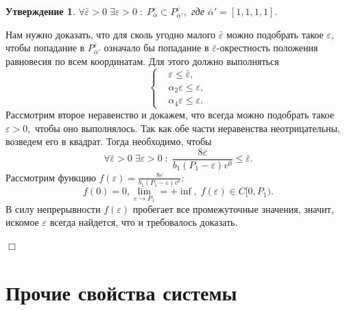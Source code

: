 \documentclass[11pt]{article}
\newtheorem{statement}{Утверждение}
\theoremstyle{definition}
\newenvironment{Proof}
{\par\noindent{\bf Доказательство.\\}} 
{\begin{flushright}$\Box$\end{flushright}}
\begin{document}
\begin{statement}
	$\forall \bar \varepsilon > 0 \; \exists \varepsilon > 0 \;:\;  P^{\varepsilon}_{\bar \alpha} \subset P^{\bar \varepsilon}_{\bar\alpha'} ,$ где
	$\bar \alpha' = [1,1,1,1].$
\end{statement}
\begin{Proof}
	Нам нужно доказать, что для сколь угодно малого $\bar \varepsilon$ можно подобрать такое $\varepsilon,$ чтобы попадание в $P^{\bar \varepsilon}_{\bar\alpha'}$ означало бы попадание в $\bar \varepsilon$-окрестность положения равновесия по всем координатам. Для этого должно выполняться
	$$
		\left\{
		\begin{aligned}
			&\varepsilon \leqslant \bar \varepsilon, \\
			&\alpha_2\varepsilon \leqslant \varepsilon, \\
			&\alpha_4\varepsilon \leqslant \varepsilon.
		\end{aligned}
		\right.
	$$
	Рассмотрим второе неравенство и докажем, что всегда можно подобрать такое $\varepsilon > 0,$ чтобы оно выполнялось. Так как обе части неравенства неотрицательны, возведем его в квадрат. Тогда необходимо, чтобы
	$$\forall \bar \varepsilon > 0 \; \exists \varepsilon > 0 \;:\; \frac{8\varepsilon}{b_1(P_1 - \varepsilon)v^0} \leqslant \bar \varepsilon.$$
	Рассмотрим функцию $f(\varepsilon) = \frac{8\varepsilon}{b_1(P_1 - \varepsilon)v^0}:$ 
	$$f(0) = 0, \lim_{\varepsilon \to P_1} = +\inf, \; f(\varepsilon) \in C[0,P_1).$$
	В силу непрерывности $f(\varepsilon)$ пробегает все промежуточные значения, значит, искомое $\varepsilon$ всегда найдется, что и требовалось доказать.
\end{Proof}


\section{Прочие свойства системы}


%
\end{document}

